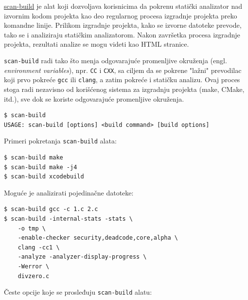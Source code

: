 \href{https://clang-analyzer.llvm.org/scan-build.html}{scan-build} je alat koji dozvoljava korisnicima da pokrenu statički analizator nad izvornim kodom projekta kao deo regularnog procesa izgradnje projekta preko komandne linije. Prilikom izgradnje projekta, kako se izvorne datoteke prevode, tako se i analiziraju statičkim analizatorom. Nakon završetka procesa izgradnje projekta, rezultati analize se mogu videti kao HTML stranice.

\texttt{scan-build} radi tako što menja odgovarajuće promenljive okruženja (engl. \emph{environment variables}), npr. \texttt{CC} i \texttt{CXX}, sa ciljem da se pokrene "lažni" prevodilac koji prvo pokreće \texttt{gcc} ili \texttt{clang}, a zatim pokreće i statičku analizu. Ovaj proces stoga radi nezavisno od korišćenog sistema za izgradnju projekta (make, CMake, itd.), sve dok se koriste odgovarajuće promenljive okruženja.

\begin{verbatim}
$ scan-build
USAGE: scan-build [options] <build command> [build options]
\end{verbatim}

Primeri pokretanja \texttt{scan-build} alata:

\begin{verbatim}
$ scan-build make
$ scan-build make -j4
$ scan-build xcodebuild
\end{verbatim}

Moguće je analizirati pojedinačne datoteke:

\begin{verbatim}
$ scan-build gcc -c 1.c 2.c
$ scan-build -internal-stats -stats \
    -o tmp \
    -enable-checker security,deadcode,core,alpha \
    clang -cc1 \
    -analyze -analyzer-display-progress \
    -Werror \
    divzero.c
\end{verbatim}

Česte opcije koje se prosleđuju \texttt{scan-build} alatu:

